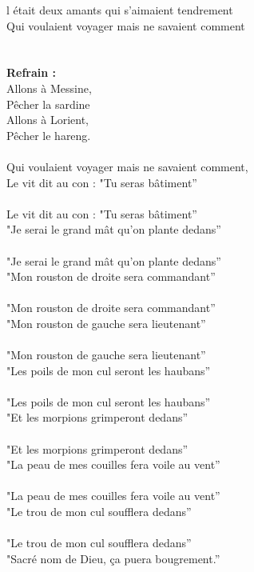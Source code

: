 \vspace{-0.3cm}
l était deux amants qui s'aimaient tendrement
\\Qui voulaient voyager mais ne savaient comment
\\\\\\\textbf{Refrain :}
\\Allons à Messine,
\\Pêcher la sardine
\\Allons à Lorient,
\\Pêcher le hareng.
\\\\Qui voulaient voyager mais ne savaient comment,
\\Le vit dit au con : "Tu seras bâtiment”
\\\\Le vit dit au con : "Tu seras bâtiment”
\\"Je serai le grand mât qu'on plante dedans”
\\\\"Je serai le grand mât qu'on plante dedans”
\\"Mon rouston de droite sera commandant”
\\\\"Mon rouston de droite sera commandant”
\\"Mon rouston de gauche sera lieutenant”
\\\\"Mon rouston de gauche sera lieutenant”
\\"Les poils de mon cul seront les haubans”
\\\\"Les poils de mon cul seront les haubans”
\\"Et les morpions grimperont dedans”
\\\\"Et les morpions grimperont dedans”
\\"La peau de mes couilles fera voile au vent”
\\\\"La peau de mes couilles fera voile au vent”
\\"Le trou de mon cul soufflera dedans”
\\\\"Le trou de mon cul soufflera dedans”
\\"Sacré nom de Dieu, ça puera bougrement.”

\breakpage